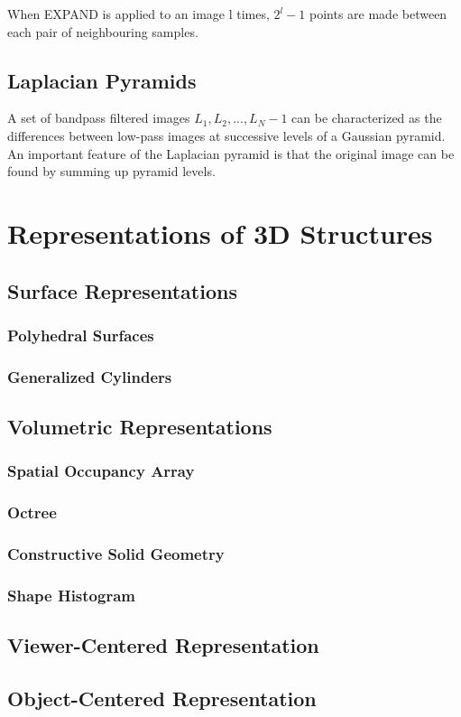 \documentclass{article}
\begin{document}
\begin{multicols}{2}
When EXPAND is applied to an image l times, $2^l-1$ points are made between each pair of neighbouring samples.

\subsection{Laplacian Pyramids}

A set of bandpass filtered images $L_1, L_2, ..., L_N-1$ can be characterized as the differences between low-pass images at successive levels of a Gaussian pyramid. An important feature of the Laplacian pyramid is that the original image can be found by summing up pyramid levels.

\section{Representations of 3D Structures}
\subsection{Surface Representations}
\subsubsection{Polyhedral Surfaces}
\subsubsection{Generalized Cylinders}
\subsection{Volumetric Representations}
\subsubsection{Spatial Occupancy Array}
\subsubsection{Octree}
\subsubsection{Constructive Solid Geometry}
\subsubsection{Shape Histogram}
\subsection{Viewer-Centered Representation}
\subsection{Object-Centered Representation}

\end{multicols}
\end{document}
